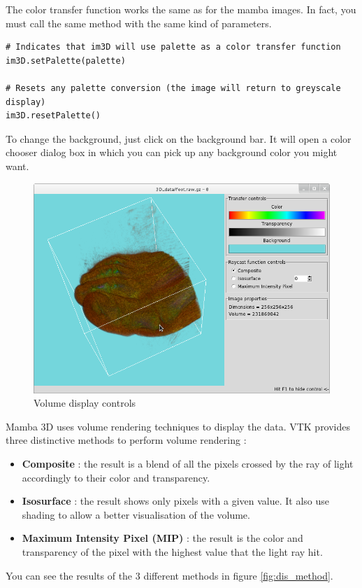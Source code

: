 \documentclass[a4paper,10pt,oneside]{article}
\begin{document}
The color transfer function works the same as for the mamba images. In fact, you
must call the same method with the same kind of parameters.

\lstset{language=Python}
\begin{lstlisting}
# Indicates that im3D will use palette as a color transfer function
im3D.setPalette(palette)

# Resets any palette conversion (the image will return to greyscale display)
im3D.resetPalette()
\end{lstlisting}

To change the background, just click on the background bar. It will open a
color chooser dialog box in which you can pick up any background color you
might want.

\begin{figure}
\centering
\includegraphics[scale=0.5]{display_ctrl.png}
\caption{Volume display controls}
\label{fig:dis_ctrl}
\end{figure}

Mamba 3D uses volume rendering techniques to display the data. VTK provides
three distinctive methods to perform volume rendering :
\begin{itemize}
\item \textbf{Composite} : the result is a blend of all the pixels crossed by
the ray of light accordingly to their color and transparency.
\item \textbf{Isosurface} : the result shows only pixels with a given
value. It also use shading to allow a better visualisation of the volume.
\item \textbf{Maximum Intensity Pixel (MIP)} : the result is the color and
transparency of the pixel with the highest value that the light ray hit.
\end{itemize}
You can see the results of the 3 different methods in figure 
\ref{fig:dis_method}.
\end{document}
